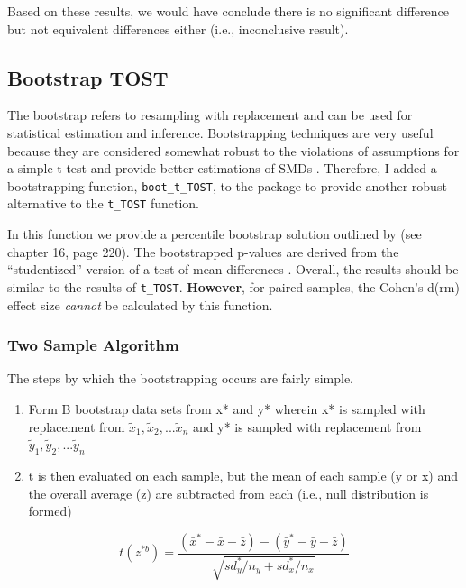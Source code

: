 \documentclass[]{interact}
\theoremstyle{plain}%
\theoremstyle{definition}
\theoremstyle{remark}
\begin{document}
Based on these results, we would have conclude there is no significant
difference but not equivalent differences either (i.e., inconclusive
result).

\newpage

\hypertarget{bootstrap-tost}{%
\subsection{Bootstrap TOST}\label{bootstrap-tost}}

The bootstrap refers to resampling with replacement and can be used for
statistical estimation and inference. Bootstrapping techniques are very
useful because they are considered somewhat robust to the violations of
assumptions for a simple t-test and provide better estimations of SMDs
\citep{Kirby2013}. Therefore, I added a bootstrapping function,
\texttt{boot\_t\_TOST}, to the package to provide another robust
alternative to the \texttt{t\_TOST} function.

In this function we provide a percentile bootstrap solution outlined by
\citet{efron93} (see chapter 16, page 220). The bootstrapped p-values
are derived from the ``studentized'' version of a test of mean
differences \citep{efron93}. Overall, the results should be similar to
the results of \texttt{t\_TOST}. \textbf{However}, for paired samples,
the Cohen's d(rm) effect size \emph{cannot} be calculated by this
function.

\hypertarget{two-sample-algorithm}{%
\subsubsection{Two Sample Algorithm}\label{two-sample-algorithm}}

The steps by which the bootstrapping occurs are fairly simple.

\begin{enumerate}
\def\labelenumi{\arabic{enumi}.}
\item
  Form B bootstrap data sets from x* and y* wherein x* is sampled with
  replacement from \(\tilde x_1,\tilde x_2, ... \tilde x_n\) and y* is
  sampled with replacement from
  \(\tilde y_1,\tilde y_2, ... \tilde y_n\)
\item
  t is then evaluated on each sample, but the mean of each sample (y or
  x) and the overall average (z) are subtracted from each (i.e., null
  distribution is formed)
\end{enumerate}

\[
t(z^{*b}) = \frac {(\bar x^*-\bar x - \bar z) - (\bar y^*-\bar y - \bar z)}{\sqrt {sd_y^*/n_y + sd_x^*/n_x}}
\]
\end{document}
